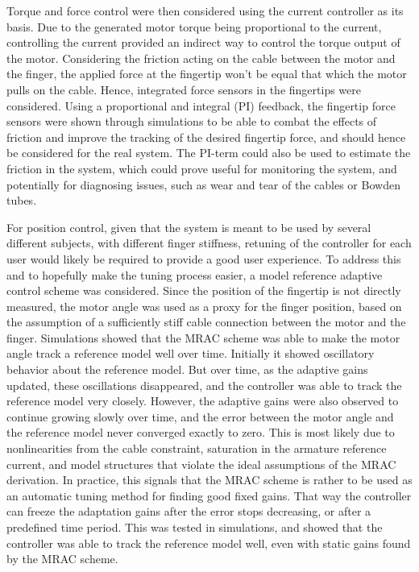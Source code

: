 Torque and force control were then considered using the current controller as its basis. Due to the generated motor torque being proportional to the current, controlling the current provided an indirect way to control the torque output of the motor. Considering the friction acting on the cable between the motor and the finger, the applied force at the fingertip won't be equal that which the motor pulls on the cable. Hence, integrated force sensors in the fingertips were considered. Using a proportional and integral (PI) feedback, the fingertip force sensors were shown through simulations to be able to combat the effects of friction and improve the tracking of the desired fingertip force, and should hence be considered for the real system. The PI-term could also be used to estimate the friction in the system, which could prove useful for monitoring the system, and potentially for diagnosing issues, such as wear and tear of the cables or Bowden tubes.

For position control, given that the system is meant to be used by several different subjects, with different finger stiffness, retuning of the controller for each user would likely be required to provide a good user experience. To address this and to hopefully make the tuning process easier, a model reference adaptive control scheme was considered. Since the position of the fingertip is not directly measured, the motor angle was used as a proxy for the finger position, based on the assumption of a sufficiently stiff cable connection between the motor and the finger. Simulations showed that the MRAC scheme was able to make the motor angle track a reference model well over time. Initially it showed oscillatory behavior about the reference model. But over time, as the adaptive gains updated, these oscillations disappeared, and the controller was able to track the reference model very closely. However, the adaptive gains were also observed to continue growing slowly over time, and the error between the motor angle and the reference model never converged exactly to zero. This is most likely due to nonlinearities from the cable constraint, saturation in the armature reference current, and model structures that violate the ideal assumptions of the MRAC derivation. In practice, this signals that the MRAC scheme is rather to be used as an automatic tuning method for finding good fixed gains. That way the controller can freeze the adaptation gains after the error stops decreasing, or after a predefined time period. This was tested in simulations, and showed that the controller was able to track the reference model well, even with static gains found by the MRAC scheme. 

